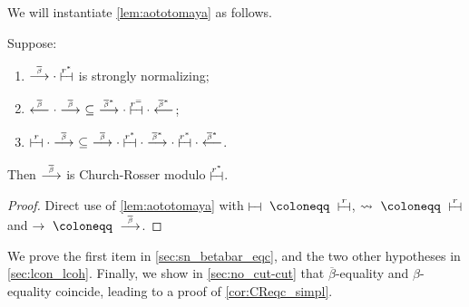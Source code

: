 \documentclass{lmcs}
\newcommand{\symboltext}[2]{\mathrel{\overset{\makebox[0pt]{\mbox{\normalfont\tiny\sffamily \ensuremath{#1}}}}{#2}}} %
\newcommand{\betabar}{\overline{\beta}}
\newcommand{\betabarto}{\symboltext{\betabar}{\longrightarrow}}
\newcommand{\betabarfrom}{\symboltext{\betabar}{\longleftarrow}}
\newcommand{\betabartostar}{\symboltext{\betabar^*}{\longrightarrow}}
\newcommand{\betabarfromstar}{\symboltext{\betabar^*}{\longleftarrow}}
\newcommand{\vdashv}{\mathrel{\lower .22ex \hbox{$\vdash\!\dashv$}}}
\DeclareRobustCommand{\astsymbol}[1]{\mathrel{\ooalign{{$\vdashv$}\crcr{$\stackrel{#1}{\hphantom{\vdashv}\vphantom{\to}}$}}}}
\newcommand{\eqcone}{\astsymbol{r}} %
\newcommand{\eqc}{\astsymbol{r^\ast}} %
\newcommand{\eqceq}{\astsymbol{r^=}} %
\begin{document}
We will instantiate \autoref{lem:aototomaya} as follows.
\begin{cor}
\label{lem:aototomaya_use}
Suppose:
\begin{enumerate}[label=\textnormal{(\roman*)}]
\item\label{item:aototomaya_use:1}
$\betabarto \cdot \eqc$ is strongly normalizing;
\item\label{item:aototomaya_use:2}
$\betabarfrom \cdot \betabarto~\subseteq~\betabartostar \cdot \eqceq \cdot \betabarfromstar$;
\item\label{item:aototomaya_use:3}
$\eqcone \cdot \betabarto~\subseteq~\betabarto \cdot \eqc \cdot \betabartostar \cdot \eqc \cdot \betabarfromstar$.
\end{enumerate}
Then $\betabarto$ is Church-Rosser modulo $\eqc$.
\end{cor}
\begin{proof}
Direct use of \autoref{lem:aototomaya} with $\vdashv~\coloneqq~\eqcone$, $\leadsto~\coloneqq~\eqcone$ and $\to~\coloneqq~\betabarto$.
\end{proof}
We prove the first item in \autoref{sec:sn_betabar_eqc}, and the two other hypotheses in \autoref{sec:lcon_lcoh}.
Finally, we show in \autoref{sec:no_cut-cut} that $\betabar$-equality and $\beta$-equality coincide, leading to a proof of \autoref{cor:CReqc_simpl}.
\end{document}

